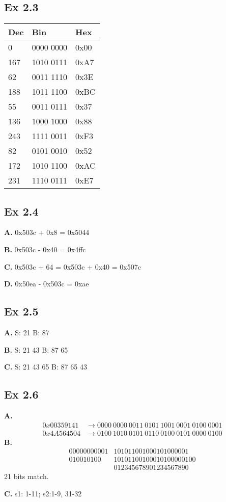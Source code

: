 \subsection{Ex 2.3}
\begin{table}[h]
    \centering
    \begin{tabular}{lll}
        \toprule
        Dec & Bin & Hex\\
        \midrule
        0 & 0000 0000 & 0x00\\
        167 & 1010 0111 & 0xA7\\
        62 & 0011 1110 & 0x3E\\
        188 & 1011 1100 & 0xBC \\
        55 & 0011 0111 & 0x37\\
        136 & 1000 1000 & 0x88\\
        243 & 1111 0011 & 0xF3\\
        82 & 0101 0010 & 0x52\\
        172 & 1010 1100 & 0xAC\\
        231 & 1110 0111 & 0xE7\\
        \bottomrule
    \end{tabular}
\end{table}

\subsection{Ex 2.4}
\textbf{A.} 0x503c + 0x8 = 0x5044 \par \noindent
\textbf{B.} 0x503c - 0x40 = 0x4ffc \par \noindent
\textbf{C.} 0x503c + 64 = 0x503c + 0x40 = 0x507c \par \noindent
\textbf{D.} 0x50ea - 0x503c = 0xae

\subsection{Ex 2.5}
\textbf{A.} S: 21 B: 87 \par \noindent
\textbf{B.} S: 21 43 B: 87 65 \par \noindent
\textbf{C.} S: 21 43 65 B: 87 65 43

\subsection{Ex 2.6}
\textbf{A.}
\begin{align*}
    0x00359141 &\rightarrow 0000\ 0000\ 0011\ 0101\ 1001\ 0001\ 0100\ 0001\\
    0x4A564504 &\rightarrow 0100\ 1010\ 0101\ 0110\ 0100\ 0101\ 0000\ 0100
\end{align*}
\textbf{B.}
\begin{align*}
    00000000001&101011001000101000001\\
    010010100&10101100100010100000100\\
             &012345678901234567890
\end{align*}
21 bits match.\par \noindent
\textbf{C.} s1: 1-11; s2:1-9, 31-32

